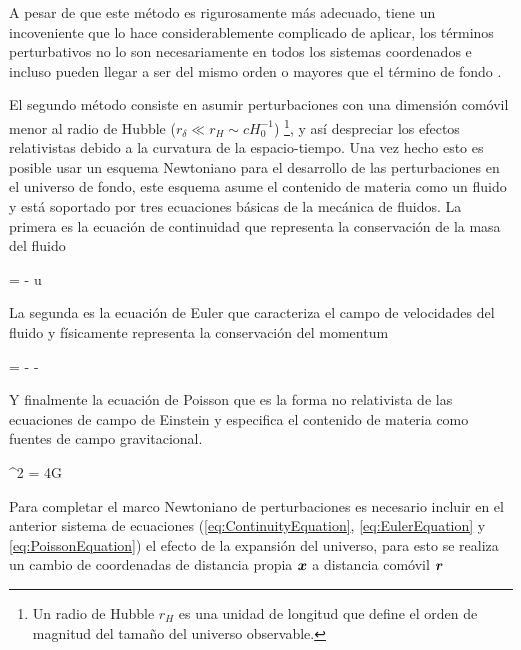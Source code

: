 A pesar de que este método es rigurosamente más adecuado, tiene un 
incoveniente que lo hace considerablemente complicado de aplicar, los 
términos perturbativos no lo son necesariamente en todos los sistemas 
coordenados e incluso pueden llegar a ser del mismo orden o mayores que el 
término de fondo \cite{padmanabhan1995}.


El segundo método consiste en asumir perturbaciones con una dimensión 
comóvil menor al radio de Hubble ($r_\delta \ll r_H \sim cH_0^{-1}$) 
\footnote{Un radio de Hubble $r_H$ es una unidad de longitud que define 
el orden de magnitud del tamaño del universo observable.}, y así 
despreciar los efectos relativistas debido a la curvatura de la 
espacio-tiempo. Una vez hecho esto es posible usar un esquema Newtoniano 
para el desarrollo de las perturbaciones en el universo de fondo, este 
esquema asume el contenido de materia como un fluido y está soportado por 
tres ecuaciones básicas de la mecánica de fluidos. La primera es la 
ecuación de continuidad que representa la conservación de la masa del 
fluido


{  = - \rho \nabla \cdot \bds u }


La segunda es la ecuación de Euler que caracteriza el campo de velocidades
del fluido y físicamente representa la conservación del momentum


{  = - - \nabla \varphi }


Y finalmente la ecuación de Poisson que es la forma no relativista de las 
ecuaciones de campo de Einstein y especifica el contenido de materia como
fuentes de campo gravitacional.
	
	
{ \nabla^2 \varphi = 4\pi G \rho }


Para completar el marco Newtoniano de perturbaciones es necesario incluir 
en el anterior sistema de ecuaciones (\ref{eq:ContinuityEquation}, 
\ref{eq:EulerEquation} y \ref{eq:PoissonEquation}) el efecto de la 
expansión del universo, para esto se realiza un cambio de coordenadas de
distancia propia $\boldsymbol{ x }$ a distancia comóvil $\boldsymbol{ r }$


